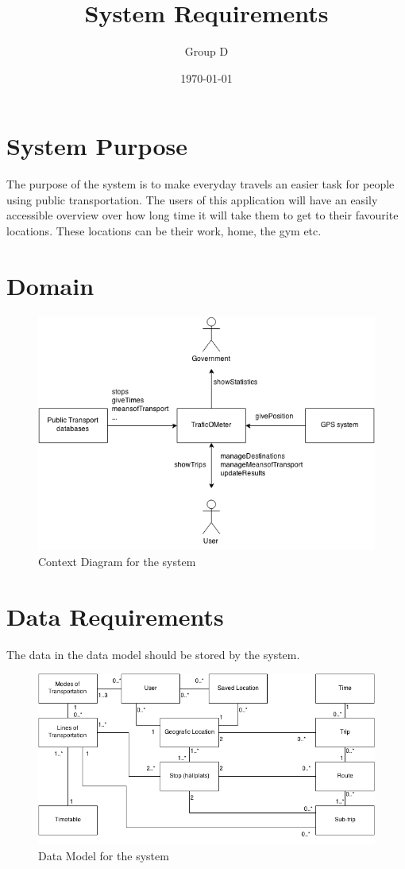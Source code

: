 \documentclass[a4paper]{article}
\title{System Requirements}
\author{Group D}
\date{\today}
\begin{document}
	\maketitle
	\thispagestyle{empty}
	\setcounter{page}{0}
	\pagebreak
	\tableofcontents
	\pagebreak
	

	\section{System Purpose} %
	The purpose of the system is to make everyday travels an easier task for people using public transportation. The users of this application will have an easily accessible overview over how long time it will take them to get to their favourite locations. These locations can be their work, home, the gym etc.
	\section{Domain}
		\begin{figure}[h]
				\includegraphics[scale=0.65]{Context-v1.png}
			\caption{Context Diagram for the system}
		\end{figure}
	\newpage
	\section{Data Requirements}
		The data in the data model should be stored by the system.	
		\begin{figure}[h]
			\includegraphics[scale=0.50]{datamodel-v1.png}
			\caption{Data Model for the system}
		\end{figure}	
\end{document}
